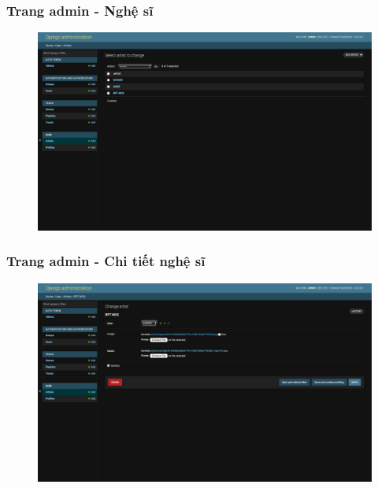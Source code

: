\documentclass[a4paper]{article}
\begin{document}
\subsubsection{Trang admin - Nghệ sĩ}
\begin{figure}[h!]
\begin{center}
\includegraphics[width=12cm]{admin_artist.png}
\end{center}
\end{figure}

\subsubsection{Trang admin - Chi tiết nghệ sĩ}
\begin{figure}[h!]
\begin{center}
\includegraphics[width=12cm]{admin_artist_detail.png}
\end{center}
\end{figure}
\newpage
\end{document}
